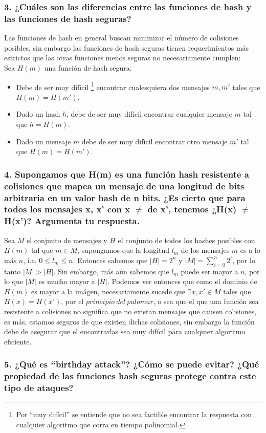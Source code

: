\documentclass[12pt]{article}
\begin{document}
\subsubsection*{3. ¿Cuáles son las diferencias entre las funciones de hash y las funciones de hash seguras?}
Las funciones de hash en general buscan minimizar el número de colisiones posibles, sin embargo las funciones de hash seguras tienen requerimientos más estrictos que las otras funciones menos seguras no necesariamente cumplen: \\
Sea $H(m)$ una función de hash segura.
\begin{itemize}
\item Debe de ser muy difícil \footnote{Por ``muy difícil'' se entiende que no sea factible encontrar la respuesta con cualquier algoritmo que corra en tiempo polinomial.} encontrar cualesquiera dos mensajes $m, m'$ tales que $H(m) = H(m')$.
\item Dado un hash $h$, debe de ser muy difícil encontrar cualquier mensaje $m$ tal que $h = H(m)$.
\item Dado un mensaje $m$ debe de ser muy difícil encontrar otro mensaje $m'$ tal que $H(m) = H(m')$.
\end{itemize}

\subsubsection*{4. Supongamos que H(m) es una función hash resistente a colisiones que mapea un mensaje de una longitud de bits arbitraria en un valor hash de n bits. ¿Es cierto que para todos los mensajes x, x’ con x $\neq$ de x’, tenemos ¿H(x) $\neq$ H(x')? Argumenta tu respuesta.}
Sea $M$ el conjunto de mensajes y $H$ el conjunto de todos los hashes posibles con $H(m)$ tal que $m \in M$, supongamos que la longitud $l_m$ de los mensajes $m$ es a lo más $n$, i.e. $0 \leq l_m \leq n$. Entonces sabemos que $|H| = 2^n$ y $|M| = \sum_{i = 0}^n 2^i$, por lo tanto $|M| > |H|$. Sin embargo, más aún sabemos que $l_m$ puede ser mayor a $n$, por lo que $|M|$ es mucho mayor a $|H|$. Podemos ver entonces que como el dominio de $H(m)$ es mayor a la imágen, necesariamente sucede que $\exists x, x' \in M$ tales que $H(x) = H(x')$, por el $principio\ del\ palomar$, o sea que el que una función sea resistente a colisiones no significa que no existan mensajes que causen colisiones, es más, estamos seguros de que existen dichas colisiones, sin embargo la función debe de asegurar que el encontrarlas sea muy difícil para cualquier algoritmo eficiente.

\subsubsection*{5. ¿Qué es “birthday attack”? ¿Cómo se puede evitar? ¿Qué propiedad de las funciones hash seguras protege contra este tipo de ataques?}
\end{document}
